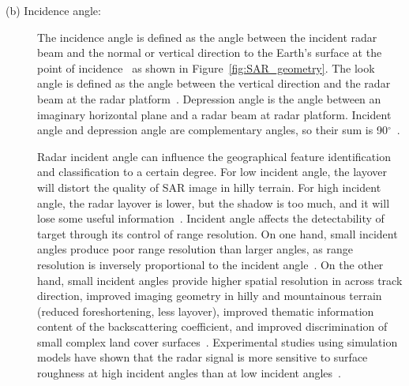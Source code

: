 \begin{description}
	\item[(b) Incidence angle:]The incidence angle is defined as the angle between the incident radar beam and the normal or vertical direction to the Earth’s surface at the point of incidence~\citep{lillesand2014remote} as shown in Figure~\ref{fig:SAR_geometry}. The look angle is defined as the angle between the vertical direction and the radar beam at the radar platform~\citep{van2011synthetic}. Depression angle is the angle between an imaginary horizontal plane and a radar beam at radar platform. Incident angle and depression angle are complementary angles, so their sum is 90$^\circ$~\citep{campbell2002introduction}. 	
		
	Radar incident angle can influence the geographical feature identification and classification to a certain degree. For low incident angle, the layover will distort the quality of SAR image in hilly terrain. For high incident angle, the radar layover is lower, but the shadow is too much, and it will lose some useful information~\citep{li2005multi}. Incident angle affects the detectability of target through its control of range resolution. On one hand, small incident angles produce poor range resolution than larger angles, as range resolution is inversely proportional to the incident angle~\citep{campbell2002introduction}. On the other hand, small incident angles provide higher spatial resolution in across track direction, improved imaging geometry in hilly and mountainous terrain (reduced foreshortening, less layover), improved thematic information content of the backscattering coefficient, and improved discrimination of small complex land cover surfaces~\citep{wegmuller2003envisat}. Experimental studies using simulation models have shown that the radar signal is more sensitive to surface roughness at high incident angles than at low incident angles~\citep{baghdadi2002potential,fung2010microwave,ulaby1986microwave,holah2005potential}.
	
\end{description}
	

